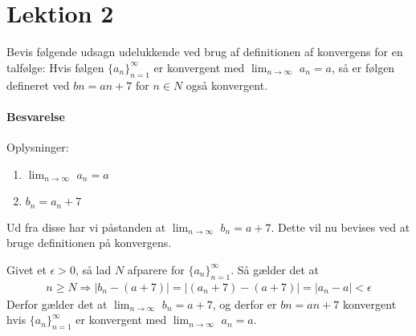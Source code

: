\chapter{Lektion 2}
Bevis følgende udsagn udelukkende ved brug af definitionen af konvergens for en talfølge: Hvis følgen $\{a_n\}^\infty_{n=1}$ er konvergent med $\lim_{n\rightarrow \infty}$ $a_n = a$, så er følgen defineret ved $bn = an + 7$ for $n \in N$ også konvergent.


\subsubsection{Besvarelse}
Oplysninger:
\begin{enumerate}
    \item $\lim_{n\rightarrow \infty}$ $a_n = a$
    \item $b_n = a_n + 7$
\end{enumerate}
Ud fra disse har vi påstanden at $\lim_{n\rightarrow \infty}$ $b_n = a+7$. Dette vil nu bevises ved at bruge definitionen på konvergens.
\begin{bev} \textbf{} %
\newline
Givet et $\epsilon>0$, så lad $N$ afparere for $\{a_n\}^\infty_{n=1}$. Så gælder det at
\begin{align*}
    n \geq N \Rightarrow |b_n - (a+7)| = |(a_n + 7) - (a+7)| = |a_n-a| < \epsilon
\end{align*}
Derfor gælder det at $\lim_{n\rightarrow \infty}$ $b_n = a+7$, og derfor er $bn = an + 7$ konvergent hvis $\{a_n\}^\infty_{n=1}$ er konvergent med $\lim_{n\rightarrow \infty}$ $a_n = a$.
\end{bev}
